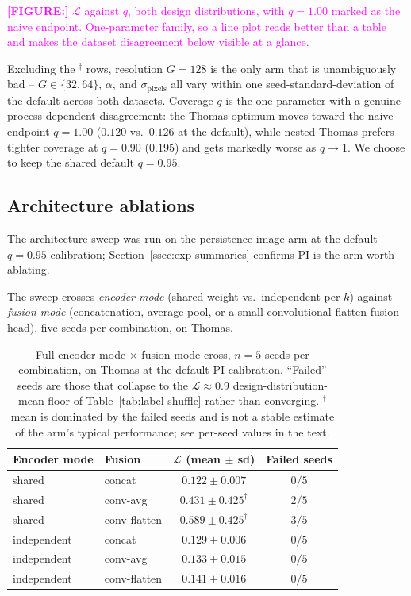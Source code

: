 \documentclass[11pt,letterpaper]{article}
\newcommand{\1}{\mathds{1}}
\newcommand{\fig}[1]{\textcolor{magenta}{\textbf{[FIGURE:] }#1}}
\theoremstyle{plain}
\theoremstyle{definitioncolon}
\begin{document}
\fig{$\mathcal{L}$ against $q$, both design distributions, with $q=1.00$ marked
as the naive endpoint. One-parameter family, so a line plot reads better than a
table and makes the dataset disagreement below visible at a glance.}

Excluding the $^\dagger$ rows, resolution $G=128$ is the only arm that is
unambiguously bad -- $G\in\{32,64\}$, $\alpha$, and $\sigma_{\text{pixels}}$
all vary within one seed-standard-deviation of the default across both
datasets. Coverage $q$ is the one parameter with a genuine process-dependent
disagreement: the Thomas optimum moves toward the naive endpoint $q=1.00$
($0.120$ vs.\ $0.126$ at the default), while nested-Thomas prefers tighter
coverage at $q=0.90$ ($0.195$) and gets markedly worse as $q\to1$. We choose
to keep the shared default $q=0.95$.

\subsection{Architecture ablations}
\label{ssec:exp-ablations}

The architecture sweep was run on the persistence-image arm at the default $q=0.95$
calibration; Section~\ref{ssec:exp-summaries} confirms PI is the arm worth
ablating.

The sweep crosses \emph{encoder mode} (shared-weight vs.\
independent-per-$k$) against \emph{fusion mode} (concatenation, average-pool,
or a small convolutional-flatten fusion head), five seeds per combination, on
Thomas.

\begin{table}[tbp]
\centering
\small
\begin{tabular}{llcc}
\toprule
Encoder mode & Fusion & $\mathcal{L}$ (mean $\pm$ sd) & Failed seeds \\
\midrule
shared      & concat        & $0.122 \pm 0.007$ & $0/5$ \\
shared      & conv-avg      & $0.431 \pm 0.425^\dagger$ & $2/5$ \\
shared      & conv-flatten  & $0.589 \pm 0.425^\dagger$ & $3/5$ \\
independent & concat        & $0.129 \pm 0.006$ & $0/5$ \\
independent & conv-avg      & $0.133 \pm 0.015$ & $0/5$ \\
independent & conv-flatten  & $0.141 \pm 0.016$ & $0/5$ \\
\bottomrule
\end{tabular}
\caption{Full encoder-mode $\times$ fusion-mode cross, $n=5$ seeds per
combination, on Thomas at the default PI calibration. ``Failed'' seeds are
those that collapse to the $\mathcal{L}\approx0.9$ design-distribution-mean
floor of Table~\ref{tab:label-shuffle} rather than converging.
$^\dagger$ mean is dominated by the failed seeds and is not a stable estimate
of the arm's typical performance; see per-seed values in the text.}
\label{tab:encoder-fusion-sweep}
\end{table}
\end{document}
